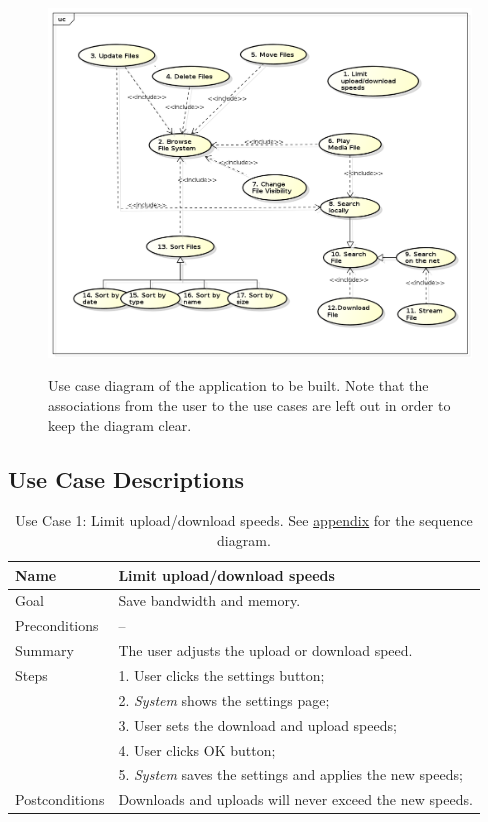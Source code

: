 \begin{center}
\begin{figure}[h]
	\centering
	\mbox{\includegraphics[width=1.2\textwidth]{Images/use_case.png}}
	\label{fig:use_case_diagram}
	\caption{Use case diagram of the application to be built.
	Note that the associations from the user to the use cases are left out in order to keep the diagram clear.}
\end{figure}
\end{center}

\clearpage
\subsection{Use Case Descriptions}
\label{sec:use_case_descriptions}

\begin{table}[h!]
\centering
\begin{tabular}{|l|l|}
\hline
Name & Limit upload/download speeds\\ \hline
Goal & Save bandwidth and memory.\\ \hline
Preconditions & -- \\ \hline
Summary & The user adjusts the upload or download speed.\\ \hline
Steps &  1. User clicks the settings button; \\
      &  2. \textit{System} shows the settings page; \\
      &  3. User sets the download and upload speeds; \\
      &  4. User clicks OK button; \\
      &  5. \textit{System} saves the settings and applies the new speeds;
        \\ \hline
Postconditions & Downloads and uploads will never exceed the new speeds.
\\ \hline
\end{tabular}
\caption{Use Case 1: Limit upload/download speeds. See \hyperref[fig:req_seq1]{appendix} for the sequence diagram.}
\label{tab:UC1}
\end{table}

